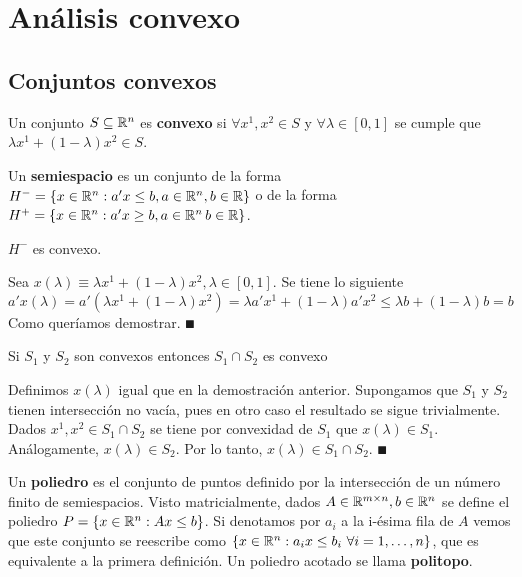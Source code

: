 \documentclass[PM.tex]{subfiles}
\begin{document}
\addtocounter{chapter}{1}
\chapter{Análisis convexo}
\section{Conjuntos convexos}

\begin{defi}
Un conjunto $S\subseteq\mathbb{R}^n$ es \textbf{convexo} si $\forall x^1,x^2\in S$ y $\forall  \lambda\in[0,1]$ se cumple que $\lambda x^1 + (1-\lambda)x^2\in S$.
\end{defi}

\begin{defi}
Un \textbf{semiespacio} es un conjunto de la forma $H^-=\left\{x\in\mathbb{R}^n: a'x\leq b, a\in\mathbb{R}^n, b\in\mathbb{R}\right\}$ o de la forma $H^+=\left\{x\in\mathbb{R}^n: a'x\geq b, a\in\mathbb{R}^n\,b\in\mathbb{R}\right\}$.
\end{defi}

\begin{prop}
$H^-$ es convexo.
\end{prop}

\begin{dem}
Sea $x(\lambda)\equiv \lambda x^1 + (1-\lambda)x^2, \lambda\in[0,1]$. Se tiene lo siguiente
\[
a'x(\lambda)=a'(\lambda x^1 + (1-\lambda)x^2)=\lambda a'x^1 +(1-\lambda)a'x^2\leq \lambda b+(1-\lambda)b=b
\]
Como queríamos demostrar. $\QED$
\end{dem}

\begin{prop}
Si $S_1$ y $S_2$ son convexos entonces $S_1\cap S_2$ es convexo
\end{prop}
\begin{dem}
Definimos $x(\lambda)$ igual que en la demostración anterior. Supongamos que $S_1$ y $S_2$ tienen intersección no vacía, pues en otro caso el resultado se sigue trivialmente. Dados $x^1,x^2\in S_1 \cap S_2$ se tiene por convexidad de $S_1$ que $x(\lambda)\in S_1$. Análogamente, $x(\lambda)\in S_2$. Por lo tanto, $x(\lambda)\in S_1\cap S_2$. $\QED$
\end{dem}

\begin{defi}
Un \textbf{poliedro} es el conjunto de puntos definido por la intersección de un número finito de semiespacios. Visto matricialmente, dados $A\in\mathbb{R}^{m\times n}, b\in \mathbb{R}^n$ se define el poliedro $P=\left\{x\in \mathbb{R}^n: Ax\leq b\right\}$. Si denotamos por $a_i$ a la i-ésima fila de $A$ vemos que este conjunto se reescribe como $\left\{x\in\mathbb{R}^n: a_ix\leq b_i\ \forall i=1,\dots, n\right\}$, que es equivalente a la primera definición. Un poliedro acotado se llama \textbf{politopo}. 
\end{defi}
\end{document}
